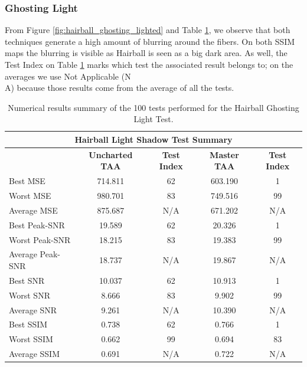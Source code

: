 \documentclass{cslthse-msc}
\begin{document}
\subsubsection{Ghosting Light}
From Figure \ref{fig:hairball_ghosting_lighted} and Table \ref{tab:hairball_ghosting_lighted}, we observe that both techniques generate a high amount of blurring around the fibers. On both SSIM maps the blurring is visible as Hairball is seen as a big dark area. As well, the Test Index on Table \ref{tab:hairball_ghosting_lighted} marks which test the associated result belongs to; on the averages we use Not Applicable (N\\A) because those results come from the average of all the tests. 
\begin{table}[H]
	\small
	\centering
	\caption{Numerical results summary of the 100 tests performed for the Hairball Ghosting Light Test.}
	\begin{tabular}{|l|c|c|c|c|}
		\hline
		\multicolumn{5}{|c|}{\textbf{Hairball Light Shadow Test Summary}} \\
		\hline
		\multicolumn{1}{|c|}{\textbf{\diagbox{Tests}{AA}}} & \textbf{Uncharted TAA} & \textbf{Test Index} & \textbf{Master TAA} & \textbf{Test Index} \\
		\hline
		Best MSE & 714.811 & 62    & 603.190 & 1 \\
		\hline
		Worst MSE & 980.701 & 83    & 749.516 & 99 \\
		\hline
		Average MSE & 875.687 & N/A   & 671.202 & N/A \\
		\hline
		Best Peak-SNR & 19.589 & 62    & 20.326 & 1 \\
		\hline
		Worst Peak-SNR & 18.215 & 83    & 19.383 & 99 \\
		\hline
		Average Peak-SNR  & 18.737 & N/A   & 19.867 & N/A \\
		\hline
		Best SNR & 10.037 & 62    & 10.913 & 1 \\
		\hline
		Worst SNR & 8.666 & 83    & 9.902 & 99 \\
		\hline
		Average SNR  & 9.261 & N/A   & 10.390 & N/A \\
		\hline
		Best SSIM & 0.738 & 62    & 0.766 & 1 \\
		\hline
		Worst SSIM & 0.662 & 99    & 0.694 & 83 \\
		\hline
		Average SSIM & 0.691 & N/A   & 0.722 & N/A \\
		\hline
	\end{tabular}%
	\label{tab:hairball_ghosting_lighted}%
\end{table}%
\end{document}

